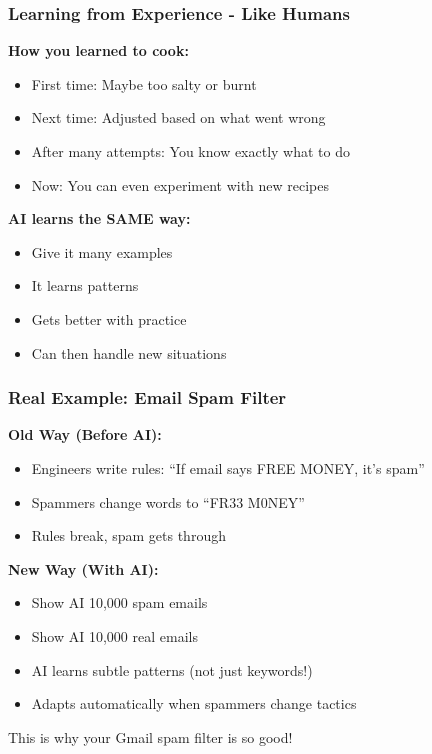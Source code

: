 \begin{frame}[fragile]\frametitle{Learning from Experience - Like Humans}

{\bf How you learned to cook:}
\begin{itemize}
\item First time: Maybe too salty or burnt
\item Next time: Adjusted based on what went wrong
\item After many attempts: You know exactly what to do
\item Now: You can even experiment with new recipes
\end{itemize}

{\bf AI learns the SAME way:}
\begin{itemize}
\item Give it many examples
\item It learns patterns
\item Gets better with practice
\item Can then handle new situations
\end{itemize}
\end{frame}

\begin{frame}[fragile]\frametitle{Real Example: Email Spam Filter}

{\bf Old Way (Before AI):}
\begin{itemize}
\item Engineers write rules: ``If email says FREE MONEY, it's spam''
\item Spammers change words to ``FR33 M0NEY''
\item Rules break, spam gets through
\end{itemize}

{\bf New Way (With AI):}
\begin{itemize}
\item Show AI 10,000 spam emails
\item Show AI 10,000 real emails
\item AI learns subtle patterns (not just keywords!)
\item Adapts automatically when spammers change tactics
\end{itemize}

This is why your Gmail spam filter is so good!
\end{frame}

